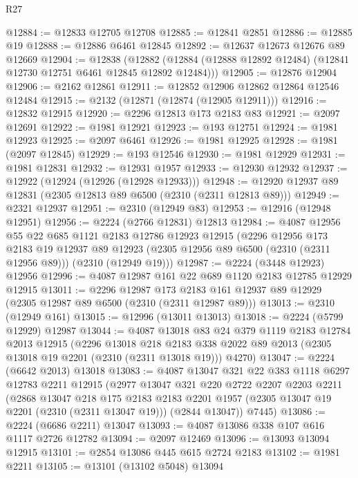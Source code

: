 \begin{lexlean}{R27}
\begin{coremodule}
@12884 := @12833 @12705 @12708
@12885 := @12841 @2851
@12886 := @12885 @19
@12888 := @12886 @6461 @12845
@12892 := @12637 @12673 @12676 @89 @12669
@12904 := @12838
    (@12882 (@12884 (@12888 @12892 @12484) (@12841 @12730 @12751 @6461 @12845 @12892 @12484)))
@12905 := @12876 @12904
@12906 := @2162 @12861
@12911 := @12852 @12906 @12862 @12864 @12546 @12484
@12915 := @2132 (@12871 (@12874 (@12905 @12911)))
@12916 := @12832 @12915
@12920 := @2296 @12813 @173 @2183 @83
@12921 := @2097 @12691
@12922 := @1981 @12921
@12923 := @193 @12751
@12924 := @1981 @12923
@12925 := @2097 @6461
@12926 := @1981 @12925
@12928 := @1981 (@2097 @12845)
@12929 := @193 @12546
@12930 := @1981 @12929
@12931 := @1981 @12831
@12932 := @12931 @1957
@12933 := @12930 @12932
@12937 := @12922 (@12924 (@12926 (@12928 @12933)))
@12948 := @12920 @12937 @89 @12831 (@2305 @12813 @89 @6500 (@2310 (@2311 @12813 @89)))
@12949 := @2321 @12937
@12951 := @2310 (@12949 @83)
@12953 := @12916 (@12948 @12951)
@12956 := @2224 (@2766 @12831) @12813
@12984 := @4087
    @12956
    @55
    @22
    @685
    @1121
    @2183
    @12786
    @12923
    @12915
    (@2296
      @12956
      @173
      @2183
      @19
      @12937
      @89
      @12923
      (@2305 @12956 @89 @6500 (@2310 (@2311 @12956 @89)))
      (@2310 (@12949 @19)))
@12987 := @2224 (@3448 @12923) @12956
@12996 := @4087 @12987 @161 @22 @689 @1120 @2183 @12785 @12929 @12915
@13011 := @2296
    @12987
    @173
    @2183
    @161
    @12937
    @89
    @12929
    (@2305 @12987 @89 @6500 (@2310 (@2311 @12987 @89)))
@13013 := @2310 (@12949 @161)
@13015 := @12996 (@13011 @13013)
@13018 := @2224 (@5799 @12929) @12987
@13044 := @4087
    @13018
    @83
    @24
    @379
    @1119
    @2183
    @12784
    @2013
    @12915
    (@2296
      @13018
      @218
      @2183
      @338
      @2022
      @89
      @2013
      (@2305 @13018 @19 @2201 (@2310 (@2311 @13018 @19)))
      @4270)
@13047 := @2224 (@6642 @2013) @13018
@13083 := @4087
    @13047
    @321
    @22
    @383
    @1118
    @6297
    @12783
    @2211
    @12915
    (@2977
      @13047
      @321
      @220
      @2722
      @2207
      @2203
      @2211
      (@2868
        @13047
        @218
        @175
        @2183
        @2183
        @2201
        @1957
        (@2305 @13047 @19 @2201 (@2310 (@2311 @13047 @19)))
        (@2844 @13047))
      @7445)
@13086 := @2224 (@6686 @2211) @13047
@13093 := @4087 @13086 @338 @107 @616 @1117 @2726 @12782
@13094 := @2097 @12469
@13096 := @13093 @13094 @12915
@13101 := @2854 @13086 @445 @615 @2724 @2183
@13102 := @1981 @2211
@13105 := @13101 (@13102 @5048) @13094

\end{coremodule}
\end{lexlean}
